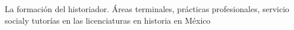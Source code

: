 \markboth{}{}
\renewcommand{\thepage}{\roman{page}}%
\thispagestyle{empty}
\cleardoublepage{}
\newpage

\thispagestyle{empty}
\phantom{abc}
\newpage

\thispagestyle{empty}
\phantom{abc}


\clearpage\setcounter{page}{3}
\pagestyle{empty}
\noindent \footnotesize{La formación del historiador.\newline
Áreas terminales, prácticas profesionales, 
servicio social\newline y tutorías en las licenciaturas en historia en México} 
\vfill
\newpage
\thispagestyle{empty}

%
%

